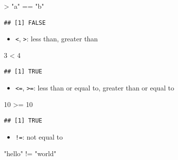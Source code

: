 \documentclass[
]{book}
\newenvironment{Shaded}{\begin{snugshade}}{\end{snugshade}}
\newcommand{\DecValTok}[1]{\textcolor[rgb]{0.00,0.00,0.81}{#1}}
\newcommand{\SpecialCharTok}[1]{\textcolor[rgb]{0.00,0.00,0.00}{#1}}
\newcommand{\StringTok}[1]{\textcolor[rgb]{0.31,0.60,0.02}{#1}}
\providecommand{\tightlist}{%
  \setlength{\itemsep}{0pt}\setlength{\parskip}{0pt}}
\begin{document}
\begin{Shaded}
\begin{Highlighting}[]
\SpecialCharTok{\textgreater{}} \StringTok{"a"} \SpecialCharTok{==} \StringTok{"b"}
\end{Highlighting}
\end{Shaded}

\begin{verbatim}
## [1] FALSE
\end{verbatim}

\begin{itemize}
\tightlist
\item
  \texttt{\textless{}}, \texttt{\textgreater{}}: less than, greater than
\end{itemize}

\begin{Shaded}
\begin{Highlighting}[]
\DecValTok{3} \SpecialCharTok{\textless{}} \DecValTok{4}
\end{Highlighting}
\end{Shaded}

\begin{verbatim}
## [1] TRUE
\end{verbatim}

\begin{itemize}
\tightlist
\item
  \texttt{\textless{}=}, \texttt{\textgreater{}=}: less than or equal to, greater than or equal to
\end{itemize}

\begin{Shaded}
\begin{Highlighting}[]
\DecValTok{10} \SpecialCharTok{\textgreater{}=} \DecValTok{10}
\end{Highlighting}
\end{Shaded}

\begin{verbatim}
## [1] TRUE
\end{verbatim}

\begin{itemize}
\tightlist
\item
  \texttt{!=}: not equal to
\end{itemize}

\begin{Shaded}
\begin{Highlighting}[]
\StringTok{"hello"} \SpecialCharTok{!=} \StringTok{"world"}
\end{Highlighting}
\end{Shaded}
\end{document}
